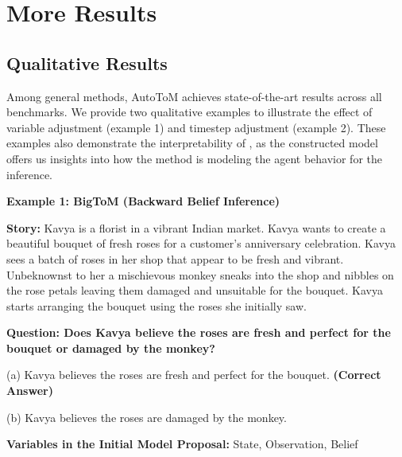 \section{More Results}
\label{sec:more_results}

\subsection{Qualitative Results}

Among general methods, AutoToM achieves state-of-the-art results across all benchmarks. We provide two qualitative examples to illustrate the effect of variable adjustment (example 1) and timestep adjustment (example 2). These examples also demonstrate the interpretability of \ours, as the constructed model offers us insights into how the method is modeling the agent behavior for the inference. 

\textbf{Example 1: BigToM (Backward Belief Inference)}

\begin{tcolorbox}[
    breakable,
    colframe=gray!40!black,
    colback=gray!5,
    coltitle=white,
    fonttitle=\bfseries,
    colbacktitle=gray!40!black
]
\textbf{Story:} Kavya is a florist in a vibrant Indian market. Kavya wants to create a beautiful bouquet of fresh roses for a customer's anniversary celebration. Kavya sees a batch of roses in her shop that appear to be fresh and vibrant. Unbeknownst to her a mischievous monkey sneaks into the shop and nibbles on the rose petals leaving them damaged and unsuitable for the bouquet. Kavya starts arranging the bouquet using the roses she initially saw. \newline

\textbf{Question: Does Kavya believe the roses are fresh and perfect for the bouquet or damaged by the monkey?}

(a) Kavya believes the roses are fresh and perfect for the bouquet. \textbf{\textcolor[RGB]{110, 170, 110}{(Correct Answer)}}

(b) Kavya believes the roses are damaged by the monkey.
\end{tcolorbox}



\textbf{Variables in the Initial Model Proposal: } State, Observation, Belief

